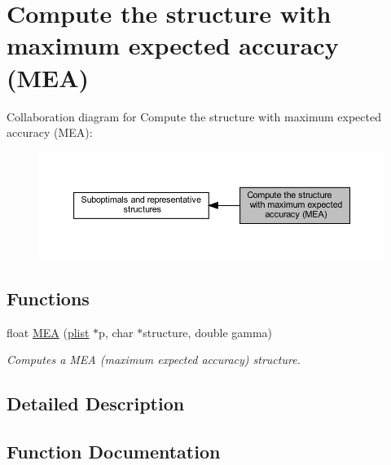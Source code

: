 \hypertarget{group__mea__fold}{}\section{Compute the structure with maximum expected accuracy (M\+EA)}
\label{group__mea__fold}
Collaboration diagram for Compute the structure with maximum expected accuracy (M\+EA)\+:
\nopagebreak
\begin{figure}[H]
\begin{center}
\leavevmode
\includegraphics[width=350pt]{group__mea__fold}
\end{center}
\end{figure}
\subsection*{Functions}
\begin{DoxyCompactItemize}
\item 
float \hyperlink{group__mea__fold_ga396ec6144c6a74fcbab4cea6b42d76c3}{M\+EA} (\hyperlink{group__data__structures_ga9608eed021ebfbdd7a901cfdc446c8e9}{plist} $\ast$p, char $\ast$structure, double gamma)
\begin{DoxyCompactList}\small\item\em Computes a M\+EA (maximum expected accuracy) structure. \end{DoxyCompactList}\end{DoxyCompactItemize}


\subsection{Detailed Description}


\subsection{Function Documentation}
\mbox{\label{group__mea__fold_ga396ec6144c6a74fcbab4cea6b42d76c3}} 
